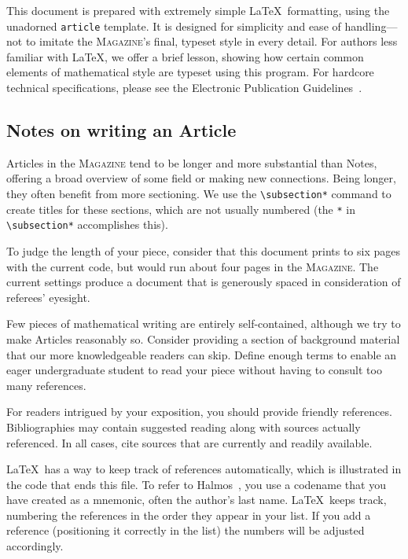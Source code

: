 \documentclass[12pt]{article}
\begin{document}
This document is prepared with extremely simple \LaTeX\ formatting,
using the unadorned \verb+article+ template.
It is designed for simplicity and ease of handling---not
to imitate the \textsc{Magazine}'s final, typeset style in every
detail.    For authors less familiar with \LaTeX, we offer a
brief lesson, showing how certain common elements of mathematical
style are typeset using this program.  For hardcore technical
specifications, please see the Electronic Publication Guidelines~\cite{MAA}.

\subsection*{Notes on writing an Article}
Articles in the \textsc{Magazine} tend to be longer and
more substantial than Notes,
offering a broad overview of some field
or making new connections.
Being longer, they often
benefit from more sectioning. We use
the \verb+\subsection*+ command to create titles
for these sections, which are not usually numbered
(the \verb+*+ in \verb+\subsection*+ accomplishes this).

To judge the length of your piece,  consider that
this document prints to six pages with the current code, but would run
about four pages in the \textsc{Magazine}.  The current settings produce
a document that is generously spaced in consideration of
referees' eyesight.

Few pieces of mathematical writing are entirely self-contained,
although we try to make Articles reasonably so.    Consider
providing a section of background material that our
more knowledgeable readers can skip. Define
enough terms to enable an eager undergraduate student
to read your piece without having to consult
too many references.

For readers intrigued by your exposition,
you should provide friendly references.
Bibliographies may contain suggested reading along with sources actually referenced.  In all cases,
cite sources that are currently and readily available.

\LaTeX\ has a way to keep track of references automatically,
which is illustrated in the code that ends this file.  To refer
to Halmos~\cite{Halmos}, you use a codename that you have created
as a mnemonic, often the author's last name.
 \LaTeX\
 keeps track, numbering the references in
the order they appear in your list.  If you add a reference
(positioning it correctly in the list) the numbers will be adjusted accordingly.
\end{document}
